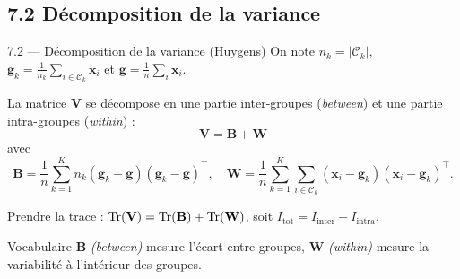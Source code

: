 \subsection{7.2 Décomposition de la variance}
\begin{frame}{7.2 — Décomposition de la variance (Huygens)}
On note $n_k = |\mathcal{C}_k|$, $\mathbf{g}_k = \frac{1}{n_k}\sum_{i \in \mathcal{C}_k} \mathbf{x}_i$
et $\mathbf{g} = \frac{1}{n}\sum_i \mathbf{x}_i$.

\begin{theorem}
La matrice $\mathbf{V}$ se décompose en une partie inter-groupes (\emph{between})
et une partie intra-groupes (\emph{within}) :
\[
\boxed{\;
\mathbf{V} = \mathbf{B} + \mathbf{W}
\;}
\]
avec
\[
\mathbf{B} = \frac{1}{n}\sum_{k=1}^K n_k (\mathbf{g}_k - \mathbf{g})(\mathbf{g}_k - \mathbf{g})^\top,
\quad
\mathbf{W} = \frac{1}{n}\sum_{k=1}^K \sum_{i \in \mathcal{C}_k} (\mathbf{x}_i - \mathbf{g}_k)(\mathbf{x}_i - \mathbf{g}_k)^\top.
\]
\end{theorem}

\begin{rema}
\small Prendre la trace : $\operatorname{Tr}(\mathbf{V}) = \operatorname{Tr}(\mathbf{B}) + \operatorname{Tr}(\mathbf{W})$, soit
$I_{\text{tot}} = I_{\text{inter}} + I_{\text{intra}}$.
\end{rema}

\begin{block}{Vocabulaire}
\small $\mathbf{B}$ \emph{(between)} mesure l'écart \alert{entre groupes},
$\mathbf{W}$ \emph{(within)} mesure la variabilité \alert{à l'intérieur} des groupes.
\end{block}
\end{frame}

